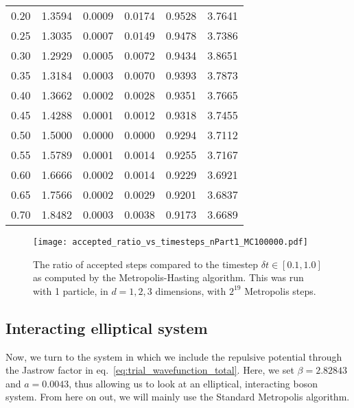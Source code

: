 \documentclass[
    a4paper, aps, twocolumn, floatfix, superscriptaddress,
    nofootinbib]{revtex4-1}
\begin{document}
\begin{table}[h!]
\begin{ruledtabular}
\begin{tabular}{cccccc}
0.20     & 1.3594 & 0.0009   & 0.0174     & 0.9528      & 3.7641    \\
0.25     & 1.3035 & 0.0007   & 0.0149     & 0.9478      & 3.7386    \\
0.30      & 1.2929 & 0.0005   & 0.0072     & 0.9434      & 3.8651    \\
0.35      & 1.3184 & 0.0003   & 0.0070     & 0.9393      & 3.7873    \\
0.40     & 1.3662 & 0.0002   & 0.0028     & 0.9351      & 3.7665    \\
0.45      & 1.4288 & 0.0001   & 0.0012     & 0.9318      & 3.7455    \\
0.50       & 1.5000 & 0.0000   & 0.0000     & 0.9294      & 3.7112    \\
0.55     & 1.5789 & 0.0001   & 0.0014     & 0.9255      & 3.7167    \\
0.60     & 1.6666 & 0.0002   & 0.0014     & 0.9229      & 3.6921    \\
0.65       & 1.7566 & 0.0002   & 0.0029     & 0.9201      & 3.6837    \\
0.70     & 1.8482 & 0.0003   & 0.0038     & 0.9173      & 3.6689 \\
\end{tabular}
\end{ruledtabular}
\end{table}

\begin{figure}[h!]
    \centering
    \texttt{[image: accepted\_ratio\_vs\_timesteps\_nPart1\_MC100000.pdf]}
    \caption{The ratio of accepted steps compared to the timestep $\delta t\in [0.1, 1.0]$ as computed by the Metropolis-Hasting algorithm. This was run with 1 particle, in $d = 1, 2, 3$ dimensions, with $2^{19}$ Metropolis steps.}
    \label{fig:c_importance_acceptance_ratio_timesteps}
\end{figure}

\subsection{Interacting elliptical system}
Now, we turn to the system in which we include the repulsive potential through the Jastrow factor in eq.~\eqref{eq:trial_wavefunction_total}. Here, we set $\beta = 2.82843$ and $a=0.0043$, thus allowing us to look at an elliptical, interacting boson system. From here on out, we will mainly use the Standard Metropolis algorithm.
\end{document}
